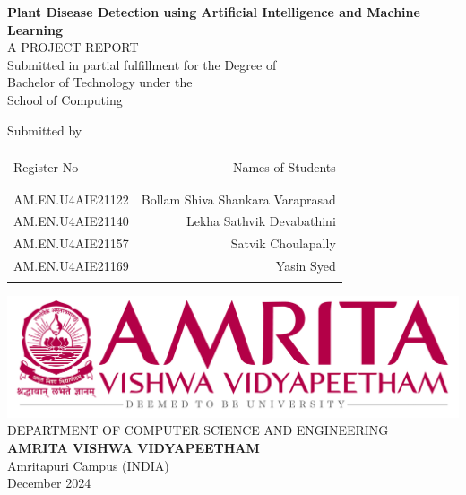 \documentclass[a4paper, 12pt]{report}
\theoremstyle{definition}
\begin{document}
	\thispagestyle{empty}
	\begin{large}
		\begin{center}
			{\Large\bfseries{Plant Disease Detection using Artificial Intelligence and Machine Learning}}\\
			\vspace{1.3cm}
			A PROJECT REPORT \\
			\vspace{.1cm}
			Submitted in partial fulfillment for the Degree of\\
			\vspace{.1cm}
			Bachelor of Technology under the\\
			\vspace{.1cm}
			School of Computing\\
			\vspace{1cm}
			
			\normalsize Submitted by \\
\begin{table}[h]
\centering
\begin{tabular}{lr}\hline \\
Register No & Names of Students \\ \\ \hline
\\
AM.EN.U4AIE21122 & Bollam Shiva Shankara Varaprasad \\
AM.EN.U4AIE21140 & Lekha Sathvik Devabathini \\
AM.EN.U4AIE21157 & Satvik Choulapally \\ 
AM.EN.U4AIE21169 & Yasin Syed \\  \\ \hline 
\end{tabular}
\end{table}



\vfill
			\includegraphics[scale=0.7]{univA.png}\\
			DEPARTMENT OF COMPUTER SCIENCE AND ENGINEERING\\
			\Large{\textbf{AMRITA VISHWA VIDYAPEETHAM}}\\
			{\large Amritapuri Campus (INDIA)}\\
			\vspace*{.3cm}
			December 2024
		\end{center}
	\end{large}
\end{document}
